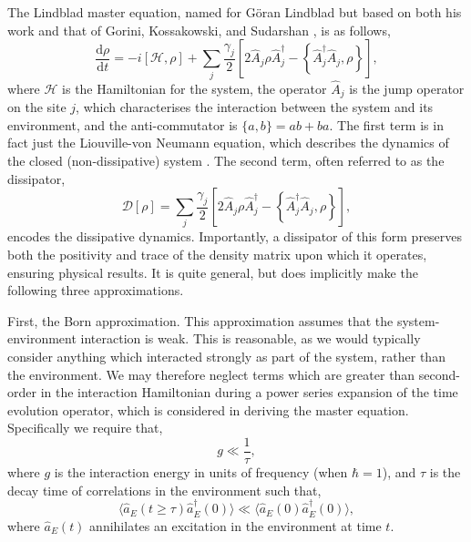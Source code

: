 The Lindblad master equation, named for G\"{o}ran Lindblad but based on both his work and that of Gorini, Kossakowski, and Sudarshan \cite{Lindblad1976,Gorini1976}, is as follows,
\begin{equation}
	\frac{\mathrm{d}\rho}{\mathrm{d}t} = -i [\mathcal{H}, \rho] + \sum_{j} \frac{\gamma_{j}}{2} \left[ 2\hat{A}_{j} \rho \hat{A}_{j}^{\dagger} - \left\{\hat{A}_{j}^{\dagger}\hat{A}_{j}, \rho\right\}\right],
	\label{eq:oqs3-1}
\end{equation}
where \(\mathcal{H}\) is the Hamiltonian for the system, the operator \(\hat{A}_{j}\) is the jump operator on the site \(j\), which characterises the interaction between the system and its environment, and the anti-commutator is \(\{a, b\} = ab + ba\). The first term is in fact just the Liouville-von Neumann equation, which describes the dynamics of the closed (non-dissipative) system \cite{BP_LvN}. The second term, often referred to as the dissipator,
\begin{equation}
	\mathcal{D}[\rho] = \sum_{j}\frac{\gamma_{j}}{2}\left[2\hat{A}_{j}\rho\hat{A}_{j}^{\dagger} - \left\{\hat{A}_{j}^{\dagger}\hat{A}_{j}, \rho\right\}\right],
	\label{eq:oqs3-2}
\end{equation}
encodes the dissipative dynamics. Importantly, a dissipator of this form preserves both the positivity and trace of the density matrix upon which it operates, ensuring physical results. It is quite general, but does implicitly make the following three approximations.

First, the Born approximation. This approximation assumes that the system-environment interaction is weak. This is reasonable, as we would typically consider anything which interacted strongly as part of the system, rather than the environment. We may therefore neglect terms which are greater than second-order in the interaction Hamiltonian during a power series expansion of the time evolution operator, which is considered in deriving the master equation. Specifically we require that,
\begin{equation}
	g \ll \frac{1}{\tau},
	\label{eq:oqs3-3}
\end{equation}
where \(g\) is the interaction energy in units of frequency (when \(\hbar = 1\)), and \(\tau\) is the decay time of correlations in the environment such that,
\begin{equation}
	\langle \hat{a}_{E}(t \geq \tau)\hat{a}_{E}^{\dagger}(0) \rangle \ll \langle \hat{a}_{E}(0)\hat{a}_{E}^{\dagger}(0) \rangle,
	\label{eq:oqs3-4}
\end{equation}
where \(\hat{a}_{E}(t)\) annihilates an excitation in the environment at time \(t\).

